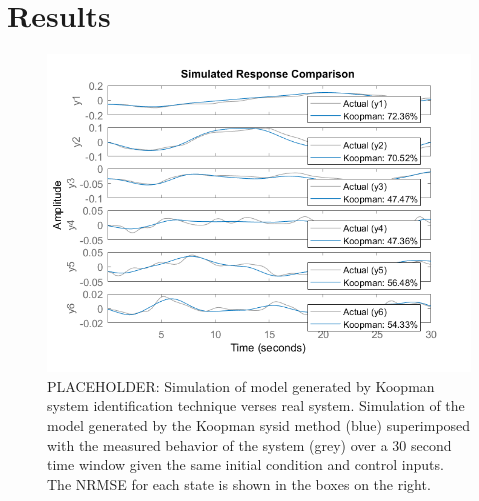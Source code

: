 \section{Results}
\label{sec:results}

\begin{figure}
    \centering
    \includegraphics[width=\linewidth]{figures/koopPlot_ph1.png}
    \caption{PLACEHOLDER: Simulation of model generated by Koopman system identification technique verses real system.
    Simulation of the model generated by the Koopman sysid method (blue) superimposed with the measured behavior of the system (grey) over a 30 second time window given the same initial condition and control inputs. The NRMSE for each state is shown in the boxes on the right. }
    \label{fig:koopmanSim}
\end{figure}

